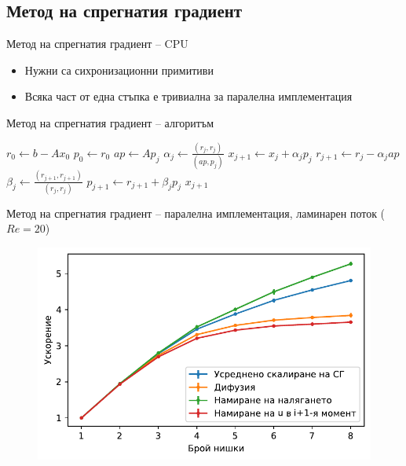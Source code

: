 \documentclass{beamer}
\begin{document}
\subsection{Метод на спрегнатия градиент}
\begin{frame}{Метод на спрегнатия градиент -- CPU}
	\begin{itemize}
		\item Нужни са сихронизационни примитиви
		\item Всяка част от една стъпка е тривиална за паралелна имплементация
	\end{itemize}
\end{frame}
\begin{frame}{Метод на спрегнатия градиент -- алгоритъм}
\begin{algorithm}[H]
\centering
{}
\caption{Метод на спрегнатия градиент за решаване на $Ax=b$ с начално приближение $x_0$}
    \begin{algorithmic}[1]
			\State $r_0 \gets b - Ax_0$
			\State $p_0 \gets r_0$
				\State $ap \gets Ap_j$
				\State $\alpha_j \gets \frac{(r_j, r_j)}{(ap, p_j)}$
				\State $x_{j+1} \gets x_j + \alpha_j p_j$
				\State $r_{j+1} \gets r_j - \alpha_j ap$
				\State $\beta_j \gets \frac{(r_{j+1}, r_{j+1})}{(r_j, r_j)}$
				\State $p_{j+1} \gets r_{j+1} + \beta_j p_j$
			\EndFor
			\State \Return $x_{j+1}$
		\EndProcedure
    \end{algorithmic}
\end{algorithm}
\end{frame}
\begin{frame}{Метод на спрегнатия градиент -- паралелна имплементация, ламинарен поток ($Re = 20$)}
\begin{figure}[H]
            \includegraphics[width=\linewidth]{../Figures/BG/LaminarCGSpeedUpC2.pdf}   
\end{figure}
\end{frame}
\end{document}
